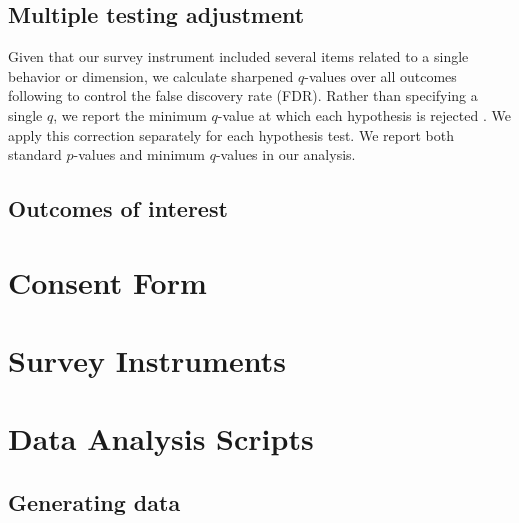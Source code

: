 \documentclass[11pt, a4paper]{article}\usepackage[]{graphicx}\usepackage[]{color}
\begin{document}
    \subsection{Multiple testing adjustment}

        Given that our survey instrument included several items related to a single behavior or dimension, we calculate sharpened $q$-values over all outcomes following \textcite{benjamini_adaptive_2006} to control the false discovery rate (FDR). Rather than specifying a single $q$, we report the minimum $q$-value at which each hypothesis is rejected \parencite{anderson_multiple_2008}. We apply this correction separately for each hypothesis test. We report both standard $p$-values and minimum $q$-values in our analysis.

    \subsection{Outcomes of interest}

\newpage

\printbibliography

\newpage

\appendix

\section{Consent Form}
\section{Survey Instruments}
\section{Data Analysis Scripts} \label{sec:rscripts}

    \subsection{Generating data}
\end{document}
